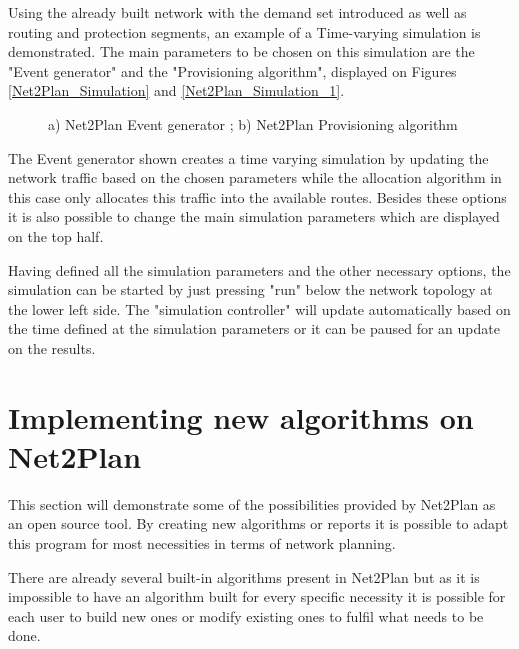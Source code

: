 	Using the already built network with the demand set introduced as well as routing and protection segments, an example of a Time-varying simulation is demonstrated. The main parameters to be chosen on this simulation are the "Event generator" and the "Provisioning algorithm", displayed on Figures \ref{Net2Plan_Simulation} and \ref{Net2Plan_Simulation_1}.
	
	\vspace{-0.3cm}
	
	\begin{figure}[!h]
		\centering
		\caption{a) Net2Plan Event generator ; b) Net2Plan Provisioning algorithm}
	\end{figure}	

	The Event generator shown creates a time varying simulation by updating the network traffic based on the chosen parameters while the allocation algorithm in this case only allocates this traffic into the available routes. Besides these options it is also possible to change the main simulation parameters which are displayed on the top half.

	Having defined all the simulation parameters and the other necessary options, the simulation can be started by just pressing "run" below the network topology at the lower left side. The "simulation controller" will update automatically based on the time defined at the simulation parameters or it can be paused for an update on the results.
	
	\newpage

	\section{Implementing new algorithms on Net2Plan}
	\vspace{1cm}
	This section will demonstrate some of the possibilities provided by Net2Plan as an open source tool. By creating new algorithms or reports it is possible to adapt this program for most necessities in terms of network planning.

	There are already several built-in algorithms present in Net2Plan but as it is impossible to have an algorithm built for every specific necessity it is possible for each user to build new ones or modify existing ones to fulfil what needs to be done.\\
	
